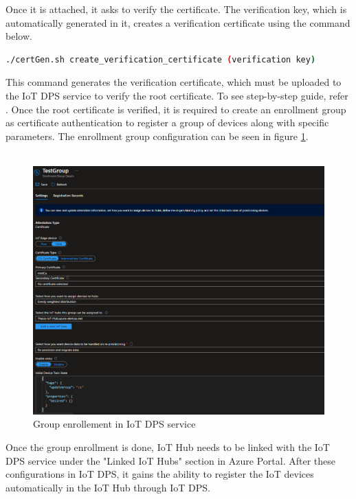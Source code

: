 \documentclass[12pt,a4paper]{article}
\begin{document}
{Once it is attached, it asks to verify the certificate. The verification key, which is automatically generated in it, creates a verification certificate using the command below.

\begin{lstlisting}[language=bash]
./certGen.sh create_verification_certificate (verification key)
\end{lstlisting}

This command generates the verification certificate, which must be uploaded to the IoT DPS service to verify the root certificate. To see step-by-step guide, refer \cite{r45}. Once the root certificate is verified, it is required to create an enrollment group as certificate authentication to register a group of devices along with specific parameters. The enrollment group configuration can be seen in figure \ref{test_group}. \\ \\

\begin{figure}[h]
\centering
\includegraphics[scale=0.65]{test_group.png}
\caption{Group enrollement in IoT DPS service}
\label{test_group}
\end{figure}

Once the group enrollment is done, IoT Hub needs to be linked with the IoT DPS service under the "Linked IoT Hubs" section in Azure Portal. After these configurations in IoT DPS, it gains the ability to register the IoT devices automatically in the IoT Hub through IoT DPS. \\

}
\end{document}
